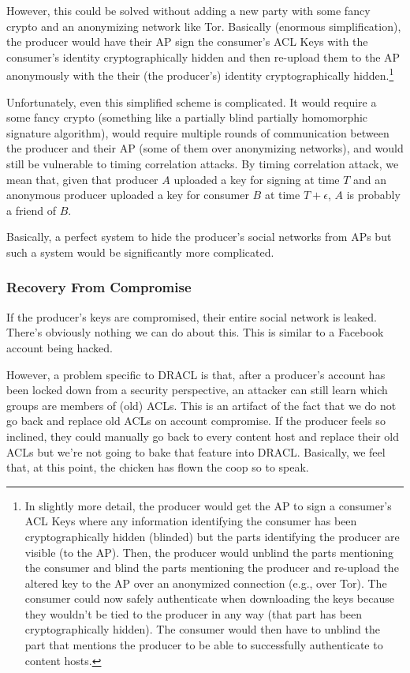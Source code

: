 \documentclass[pdftex,12pt,a4papaer,twoside,notitlepage]{report}
\begin{document}
However, this could be solved without adding a new party with some fancy crypto
and an anonymizing network like Tor. Basically (enormous simplification), the
producer would have their AP sign the consumer's ACL Keys with the consumer's
identity cryptographically hidden and then re-upload them to the AP anonymously
with the their (the producer's) identity cryptographically hidden.\footnote{In
  slightly more detail, the producer would get the AP to sign a consumer's ACL
  Keys where any information identifying the consumer has been cryptographically
  hidden (blinded) but the parts identifying the producer are visible (to the
  AP). Then, the producer would unblind the parts mentioning the consumer and
  blind the parts mentioning the producer and re-upload the altered key to the AP
  over an anonymized connection (e.g., over Tor). The consumer could now safely
  authenticate when downloading the keys because they wouldn't be tied to the
  producer in any way (that part has been cryptographically hidden). The
  consumer would then have to unblind the part that mentions the producer to be
  able to successfully authenticate to content hosts.}

Unfortunately, even this simplified scheme is complicated. It would require a
some fancy crypto (something like a partially blind partially homomorphic
signature algorithm), would require multiple rounds of communication between the
producer and their AP (some of them over anonymizing networks), and would still
be vulnerable to timing correlation attacks. By timing correlation attack, we
mean that, given that producer $A$ uploaded a key for signing at time $T$ and an
anonymous producer uploaded a key for consumer $B$ at time $T+\epsilon$, $A$ is
probably a friend of $B$.

Basically, a perfect system to hide the producer's social networks from APs but
such a system would be significantly more complicated.

\subsubsection{Recovery From Compromise}

If the producer's keys are compromised, their entire social network is leaked.
There's obviously nothing we can do about this. This is similar to a Facebook
account being hacked.

However, a problem specific to DRACL is that, after a producer's account has
been locked down from a security perspective, an attacker can still learn which
groups are members of (old) ACLs. This is an artifact of the fact that we do not
go back and replace old ACLs on account compromise. If the producer feels so
inclined, they could manually go back to every content host and replace their
old ACLs but we're not going to bake that feature into DRACL. Basically, we feel
that, at this point, the chicken has flown the coop so to speak.
\end{document}
